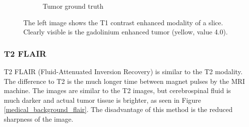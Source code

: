 \begin{figure}[H]
\begin{subfigure}{.5\textwidth}
        \caption{Tumor ground truth}
    \end{subfigure}
    \caption{The left image shows the T1 contrast enhanced modality of a slice. Clearly visible is the gadolinium enhanced tumor (yellow, value 4.0).}
    \label{medical_background_t1ce}
\end{figure}


\clearpage

\subsubsection{T2 FLAIR}
T2 FLAIR (Fluid-Attenuated Inversion Recovery) \cite{mribasics} is similar to the T2 modality. The difference to T2 is the much longer time between magnet pulses by the MRI machine.
The images are similar to the T2 images, but cerebrospinal fluid is much darker and actual tumor tissue is brighter, as seen in Figure \ref{medical_background_flair}. The disadvantage
of this method is the reduced sharpness of the image.

